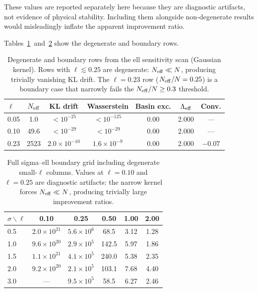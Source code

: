 These values are reported separately here because they are diagnostic
artifacts, not evidence of physical stability.
Including them alongside non-degenerate results would misleadingly inflate
the apparent improvement ratio.

Tables~\ref{tab:degenerate_ell_sensitivity}~and~\ref{tab:degenerate_sigma_ell}
show the degenerate and boundary rows.

\begin{table}[!htbp]
  \centering
  \caption{Degenerate and boundary rows from the ell sensitivity scan
  (Gaussian kernel). Rows with $\ell \lesssim 0.25$ are degenerate:
  $N_{\rm eff} \ll N$, producing trivially vanishing KL drift.
  The $\ell = 0.23$ row ($N_{\rm eff}/N = 0.25$) is a boundary case
  that narrowly fails the $N_{\rm eff}/N \ge 0.3$ threshold.}
  \label{tab:degenerate_ell_sensitivity}
  \scriptsize
  \begin{tabular}{lcccccc}
    \toprule
    $\ell$ & $N_{\rm eff}$ & KL drift & Wasserstein & Basin exc. & $\Lambda_{\rm eff}$ & Conv. \\
    \midrule
    0.05 & 1.0 & $<10^{-25}$ & $<10^{-125}$ & 0.00 & 2.000 & --- \\
    0.10 & 49.6 & $<10^{-29}$ & $<10^{-29}$ & 0.00 & 2.000 & --- \\
    0.23 & 2523 & $2.0\times10^{-10}$ & $1.6\times10^{-9}$ & 0.00 & 2.000 & $-0.07$ \\
    \bottomrule
  \end{tabular}
\end{table}

\begin{table}[!htbp]
  \centering
  \caption{Full sigma--ell boundary grid including degenerate small-$\ell$
  columns. Values at $\ell=0.10$ and $\ell=0.25$ are diagnostic artifacts:
  the narrow kernel forces $N_{\rm eff} \ll N$, producing trivially large
  improvement ratios.}
  \label{tab:degenerate_sigma_ell}
  \scriptsize
  \begin{tabular}{lccccc}
    \toprule
    $\sigma \backslash \ell$ & 0.10 & 0.25 & 0.50 & 1.00 & 2.00 \\
    \midrule
    0.5 & $2.0\times10^{21}$ & $5.6\times10^{6}$ & 68.5 & 3.12 & 1.28 \\
    1.0 & $9.6\times10^{20}$ & $2.9\times10^{5}$ & 142.5 & 5.97 & 1.86 \\
    1.5 & $1.1\times10^{21}$ & $4.1\times10^{5}$ & 240.0 & 5.38 & 2.35 \\
    2.0 & $9.2\times10^{20}$ & $2.1\times10^{5}$ & 103.1 & 7.68 & 4.40 \\
    3.0 & --- & $9.5\times10^{5}$ & 58.5 & 6.27 & 2.46 \\
    \bottomrule
  \end{tabular}
\end{table}
